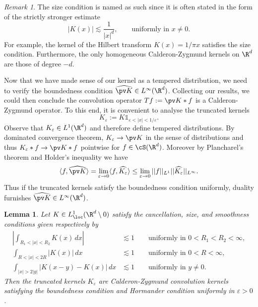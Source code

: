 \documentclass[reqno]{amsart}
\newtheorem{lemma}[theorem]{Lemma}
\theoremstyle{definition}
\theoremstyle{remark}
\newtheorem*{remark}{Remark}
\renewcommand{\epsilon}{\varepsilon}
\begin{document}
\begin{remark}
	The size condition is named as such since it is often stated in the form of the strictly stronger estimate
		\[ |K(x)| \lesssim \frac{1}{|x|^d}, \qquad \text{uniformly in $x \neq 0$}. \]
	For example, the kernel of the Hilbert transform $K(x) = 1/\pi x$ satisfies the size condition. Furthermore, the only homogeneous Calderon-Zygmund kernels on $\R^d$ are those of degree $-d$. 
\end{remark}

Now that we have made sense of our kernel as a tempered distribution, we need to verify the boundedness condition $\widehat{\pv K} \in L^\infty (\R^d)$. Collecting our results, we could then conclude the convolution operator $T f := \pv K * f$ is a Calderon-Zygmund operator. To this end, it is convenient to analyse the truncated kernels
	\[ K_\epsilon := K \mathbb 1_{\epsilon < |x| < 1/\epsilon}.
	 \]
Observe that $K_\epsilon \in L^1 (\R^d)$ and therefore define tempered distributions. By dominated convergence theorem, $K_\epsilon \to \pv K$ in the sense of distributions and thus $K_\epsilon * f \to \pv K * f$ pointwise for $f \in \cS (\R^d)$. Moreover by Plancharel's theorem and Holder's inequality we have
	\[ \langle f, \widehat{\pv K} \rangle = \lim_{\epsilon \to 0} \langle f, \widehat{K_\epsilon} \rangle \leq \lim_{\epsilon \to 0} || f||_{L^1} ||\widehat{K_\epsilon}||_{L^\infty}.  \]
Thus if the truncated kernels satisfy the boundedness condition uniformly, duality furnishes $\widehat{\pv K} \in L^\infty (\R^d)$. 

\begin{lemma}
	Let $K \in L^1_{\loc} (\R^d \setminus 0)$ satisfy the cancellation, size, and smoothness conditions given respectively by 
	\begin{align*}
		 \left| \int_{R_1 < |x| < R_2} K(x) \, dx \right| 
		 	&\lesssim 1 \qquad \text{uniformly in $0 < R_1 < R_2 < \infty$}, \\
		 \int_{R < |x| < 2R} |K(x)| \, dx 
		 	&\lesssim 1 \qquad \text{uniformly in $0 < R < \infty$}, \\
		 \int_{|x| > 2|y|} |K(x - y) - K(x)| \, dx 
		 	&\lesssim 1 \qquad \text{uniformly in $y \neq 0$.}
	\end{align*}
	Then the truncated kernels $K_\epsilon$ are Calderon-Zygmund convolution kernels satisfying the boundedness condition and Hormander condition uniformly in $\epsilon > 0$.
\end{lemma}
\end{document}
